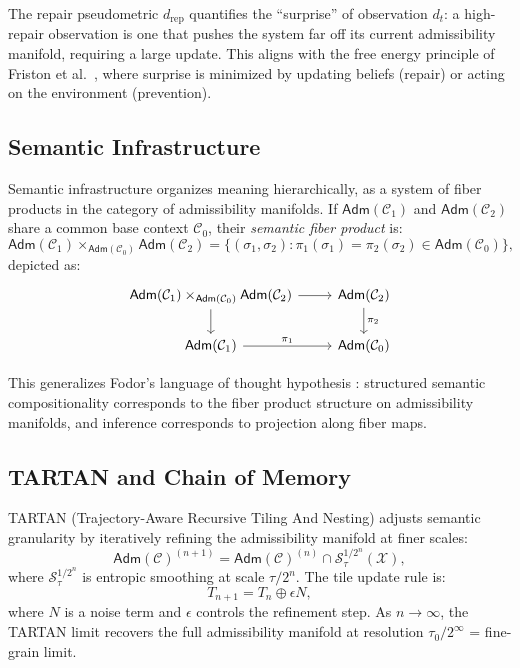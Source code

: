 \documentclass[a4paper,12pt]{article}
\theoremstyle{definition}
\newcommand{\Stau}{\mathcal{S}_\tau}
\newcommand{\X}{\mathcal{X}}
\newcommand{\Adm}{\mathsf{Adm}}
\newcommand{\dRP}{d_{\mathrm{rep}}}
\begin{document}
The repair pseudometric $\dRP$ quantifies the ``surprise'' of observation $d_t$: a high-repair observation is one that pushes the system far off its current admissibility manifold, requiring a large update. This aligns with the free energy principle of Friston et al.\ \cite{Friston2010}, where surprise is minimized by updating beliefs (repair) or acting on the environment (prevention).

\subsection{Semantic Infrastructure}

Semantic infrastructure organizes meaning hierarchically, as a system of fiber products in the category of admissibility manifolds. If $\Adm(\mathcal{C}_1)$ and $\Adm(\mathcal{C}_2)$ share a common base context $\mathcal{C}_0$, their \emph{semantic fiber product} is:
\[
\Adm(\mathcal{C}_1) \times_{\Adm(\mathcal{C}_0)} \Adm(\mathcal{C}_2) = \{(\sigma_1, \sigma_2) : \pi_1(\sigma_1) = \pi_2(\sigma_2) \in \Adm(\mathcal{C}_0)\},
\]
depicted as:
\[
\begin{tikzcd}
\Adm(\mathcal{C}_1) \times_{\Adm(\mathcal{C}_0)} \Adm(\mathcal{C}_2) \arrow[r] \arrow[d] & \Adm(\mathcal{C}_2) \arrow[d, "\pi_2"] \\
\Adm(\mathcal{C}_1) \arrow[r, "\pi_1"] & \Adm(\mathcal{C}_0)
\end{tikzcd}
\]

This generalizes Fodor's language of thought hypothesis \cite{Fodor1983}: structured semantic compositionality corresponds to the fiber product structure on admissibility manifolds, and inference corresponds to projection along fiber maps.

\subsection{TARTAN and Chain of Memory}

TARTAN (Trajectory-Aware Recursive Tiling And Nesting) adjusts semantic granularity by iteratively refining the admissibility manifold at finer scales:
\[
\Adm(\mathcal{C})^{(n+1)} = \Adm(\mathcal{C})^{(n)} \cap \Stau^{1/2^n}(\X),
\]
where $\Stau^{1/2^n}$ is entropic smoothing at scale $\tau / 2^n$. The tile update rule is:
\[
T_{n+1} = T_n \oplus \epsilon N,
\]
where $N$ is a noise term and $\epsilon$ controls the refinement step. As $n \to \infty$, the TARTAN limit recovers the full admissibility manifold at resolution $\tau_0 / 2^\infty$ = fine-grain limit.
\end{document}
